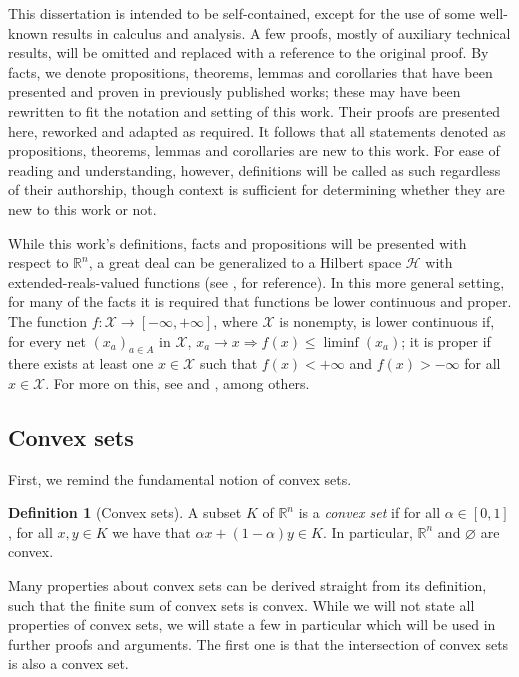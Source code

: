 \documentclass[smallextended,numbook,nospthms]{svjour3}
\theoremstyle{plain}
\theoremstyle{definition}
\newtheorem{definition}[theorem]{Definition}
\def\RR{\mathds R}
\begin{document}
This dissertation is intended to be self-contained, except for the use of some well-known results in calculus and analysis. A few proofs, mostly of auxiliary technical results, will be omitted and replaced with a reference to the original proof. By facts, we denote propositions, theorems, lemmas and corollaries that have been presented and proven in previously published works; these may have been rewritten to fit the notation and setting of this work. Their proofs are presented here, reworked and adapted as required. It follows that all statements denoted as propositions, theorems, lemmas and corollaries are new to this work. For ease of reading and understanding, however, definitions will be called as such regardless of their authorship, though context is sufficient for determining whether they are new to this work or not.

While this work's definitions, facts and propositions will be presented with respect to $\RR^n$, a great deal can be generalized to a Hilbert space $\mathcal{H}$ with extended-reals-valued functions (see \cite{BC2011}, for reference). In this more general setting, for many of the facts it is required that functions be lower continuous and proper. The function $f:\mathcal{X} \rightarrow [-\infty,+\infty]$, where $\mathcal{X}$ is nonempty, is lower continuous if, for every net $\left(x_{a}\right)_{a \in A}$ in $\mathcal{X}$, $x_{a} \rightarrow x \Rightarrow f(x) \leq \liminf \left(x_{a}\right)$; it is proper if there exists at least one $x \in \mathcal{X}$ such that  $f(x)<+\infty$ and $f(x)>-\infty$ for all $x \in \mathcal{X}$.  For more on this, see \cite[Sections 7 and 30]{Rockafellar:1996} and \cite[Chapter 1 and 9]{BC2011}, among others.

\subsection{Convex sets}
First, we remind the fundamental notion of convex sets.
\begin{definition}[Convex sets]\label{def:convex}
	A subset $K$ of $\RR^n$ is a \emph{convex set} if for all $\alpha \in [0,1]$, for all $x,y \in K$ we have that $\alpha x + (1-\alpha)y \in K$. In particular, $\RR^n$ and $\varnothing$ are convex.
	\end{definition}

Many properties about convex sets can be derived straight from its definition, such that the finite sum of convex sets is convex. While we will not state all properties of convex sets, we will state a few in particular which will be used in further proofs and arguments. The first one is that the intersection of convex sets is also a convex set.
\end{document}
